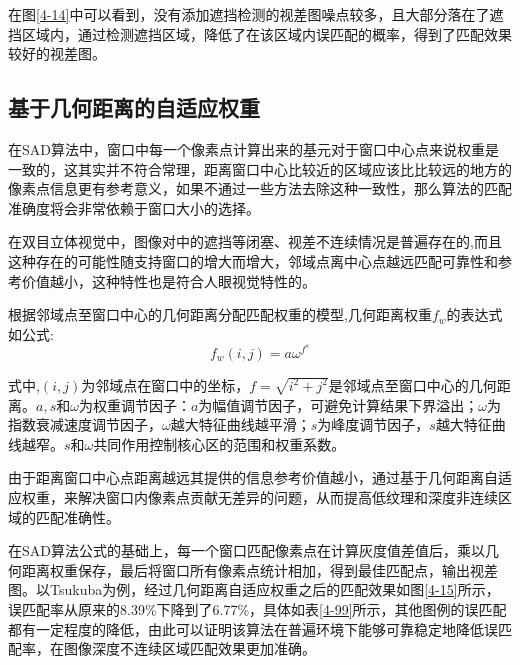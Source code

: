 
在图\ref{4-14}中可以看到，没有添加遮挡检测的视差图噪点较多，且大部分落在了遮挡区域内，通过检测遮挡区域，降低了在该区域内误匹配的概率，得到了匹配效果较好的视差图。

\subsection{基于几何距离的自适应权重}

在SAD算法中，窗口中每一个像素点计算出来的基元对于窗口中心点来说权重是一致的，这其实并不符合常理，距离窗口中心比较近的区域应该比比较远的地方的像素点信息更有参考意义，如果不通过一些方法去除这种一致性，那么算法的匹配准确度将会非常依赖于窗口大小的选择。

在双目立体视觉中，图像对中的遮挡等闭塞、视差不连续情况是普遍存在的,而且这种存在的可能性随支持窗口的增大而增大，邻域点离中心点越远匹配可靠性和参考价值越小，这种特性也是符合人眼视觉特性的。


根据邻域点至窗口中心的几何距离分配匹配权重的模型,几何距离权重$f_{w}$的表达式如公式: 
\begin{equation}
f_{w}(i,j) = a\omega ^{f^{s}}
\end{equation}

式中,$(i,j)$为邻域点在窗口中的坐标，$f=\sqrt{i^{2}+j^{2}}$是邻域点至窗口中心的几何距离。$a,s$和$\omega$为权重调节因子：$a$为幅值调节因子，可避免计算结果下界溢出；$\omega$为指数衰减速度调节因子，$\omega$越大特征曲线越平滑；$s$为峰度调节因子，$s$越大特征曲线越窄。$s$和$\omega$共同作用控制核心区的范围和权重系数。

由于距离窗口中心点距离越远其提供的信息参考价值越小，通过基于几何距离自适应权重，来解决窗口内像素点贡献无差异的问题，从而提高低纹理和深度非连续区域的匹配准确性。

在SAD算法公式的基础上，每一个窗口匹配像素点在计算灰度值差值后，乘以几何距离权重保存，最后将窗口所有像素点统计相加，得到最佳匹配点，输出视差图。以Tsukuba为例，经过几何距离自适应权重之后的匹配效果如图\ref{4-15}所示，误匹配率从原来的8.39\%下降到了6.77\%，具体如表\ref{4-99}所示，其他图例的误匹配都有一定程度的降低，由此可以证明该算法在普遍环境下能够可靠稳定地降低误匹配率，在图像深度不连续区域匹配效果更加准确。


